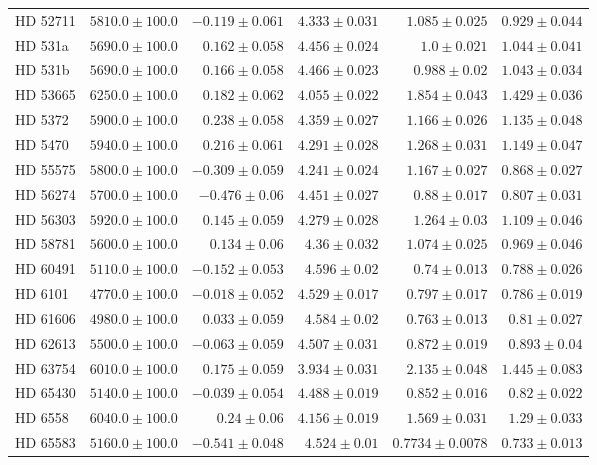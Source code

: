 \begin{longtable*}{lrrrrr}
HD 52711 & $5810.0\pm 100.0$ & $-0.119\pm 0.061$ & $4.333\pm 0.031$ & $1.085\pm 0.025$ & $0.929\pm 0.044$ \\ 
HD 531a & $5690.0\pm 100.0$ & $0.162\pm 0.058$ & $4.456\pm 0.024$ & $1.0\pm 0.021$ & $1.044\pm 0.041$ \\ 
HD 531b & $5690.0\pm 100.0$ & $0.166\pm 0.058$ & $4.466\pm 0.023$ & $0.988\pm 0.02$ & $1.043\pm 0.034$ \\ 
HD 53665 & $6250.0\pm 100.0$ & $0.182\pm 0.062$ & $4.055\pm 0.022$ & $1.854\pm 0.043$ & $1.429\pm 0.036$ \\ 
HD 5372 & $5900.0\pm 100.0$ & $0.238\pm 0.058$ & $4.359\pm 0.027$ & $1.166\pm 0.026$ & $1.135\pm 0.048$ \\ 
HD 5470 & $5940.0\pm 100.0$ & $0.216\pm 0.061$ & $4.291\pm 0.028$ & $1.268\pm 0.031$ & $1.149\pm 0.047$ \\ 
HD 55575 & $5800.0\pm 100.0$ & $-0.309\pm 0.059$ & $4.241\pm 0.024$ & $1.167\pm 0.027$ & $0.868\pm 0.027$ \\ 
HD 56274 & $5700.0\pm 100.0$ & $-0.476\pm 0.06$ & $4.451\pm 0.027$ & $0.88\pm 0.017$ & $0.807\pm 0.031$ \\ 
HD 56303 & $5920.0\pm 100.0$ & $0.145\pm 0.059$ & $4.279\pm 0.028$ & $1.264\pm 0.03$ & $1.109\pm 0.046$ \\ 
HD 58781 & $5600.0\pm 100.0$ & $0.134\pm 0.06$ & $4.36\pm 0.032$ & $1.074\pm 0.025$ & $0.969\pm 0.046$ \\ 
HD 60491 & $5110.0\pm 100.0$ & $-0.152\pm 0.053$ & $4.596\pm 0.02$ & $0.74\pm 0.013$ & $0.788\pm 0.026$ \\ 
HD 6101 & $4770.0\pm 100.0$ & $-0.018\pm 0.052$ & $4.529\pm 0.017$ & $0.797\pm 0.017$ & $0.786\pm 0.019$ \\ 
HD 61606 & $4980.0\pm 100.0$ & $0.033\pm 0.059$ & $4.584\pm 0.02$ & $0.763\pm 0.013$ & $0.81\pm 0.027$ \\ 
HD 62613 & $5500.0\pm 100.0$ & $-0.063\pm 0.059$ & $4.507\pm 0.031$ & $0.872\pm 0.019$ & $0.893\pm 0.04$ \\ 
HD 63754 & $6010.0\pm 100.0$ & $0.175\pm 0.059$ & $3.934\pm 0.031$ & $2.135\pm 0.048$ & $1.445\pm 0.083$ \\ 
HD 65430 & $5140.0\pm 100.0$ & $-0.039\pm 0.054$ & $4.488\pm 0.019$ & $0.852\pm 0.016$ & $0.82\pm 0.022$ \\ 
HD 6558 & $6040.0\pm 100.0$ & $0.24\pm 0.06$ & $4.156\pm 0.019$ & $1.569\pm 0.031$ & $1.29\pm 0.033$ \\ 
HD 65583 & $5160.0\pm 100.0$ & $-0.541\pm 0.048$ & $4.524\pm 0.01$ & $0.7734\pm 0.0078$ & $0.733\pm 0.013$ \\ 

\end{longtable*}
